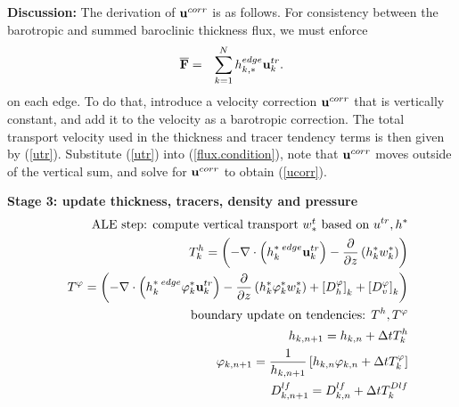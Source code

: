 \documentclass[11pt]{report}
\newcommand{\bea}{\begin{eqnarray}}
\newcommand{\eea}{\end{eqnarray}}
\begin{document}
{\bf Discussion:} The derivation of ${\bf u}^{corr}$ is as follows.  For consistency between the barotropic and summed baroclinic thickness flux,  we must enforce
\begin{eqnarray}
{\overline {\bf F}} &=& \sum_{k=1}^N h_{k,*}^{edge} {\bf u}_k^{tr}. \label{flux.condition}
\label{BclBtrFluxConsistency}
\end{eqnarray}
on each edge.  To do that, introduce a velocity correction ${\bf u}^{corr}$ that is vertically constant, and add it to the velocity as a barotropic correction.  The total transport velocity used in the thickness and tracer tendency terms is then given by (\ref{utr}).  Substitute (\ref{utr}) into (\ref{flux.condition}), note that ${\bf u}^{corr}$ moves outside of the vertical sum, and solve for ${\bf u}^{corr}$ to obtain (\ref{ucorr}).

\newpage
{\bf Stage 3: update thickness, tracers, density and pressure}
\bea &&
\mbox{ALE step: compute vertical transport $w^t_*$ based on } u^{tr}, h^* \\ &&
T^h_k = \left(  - \nabla \cdot \left( h_k^{*\; edge} {\bf u}_k^{tr} \right)  
- \frac{\partial}{\partial z} \left( h_k^* w_k^* \right)  \right)
\\ && 
T^\varphi %
= \left(  - \nabla \cdot \left( h_k^{*\; edge}\varphi_k^* {\bf u}_k^{tr} \right)  
- \frac{\partial}{\partial z} \left( h_k^*\varphi_k^* w_k^* \right)  
+ \left[D^\varphi_h\right]_k +  \left[D^\varphi_v\right]_k
\right) 
\\ &&
\mbox{boundary update on tendencies: } T^h,T^\varphi\\&& 
h_{k,n+1} = h_{k,n} +  \Delta t T^h_k \\&& 
\label{phi3}
{\varphi}_{k,n+1} = \frac{1}{h_{k,n+1}} \left[
h_{k,n} \varphi_{k,n} 
+ \Delta t T^\varphi_k \right]
\label{phi}
\\&&
D^{lf}_{k,n+1} = D^{lf}_{k,n} + \Delta t T^{Dlf}_k 
\eea
\end{document}
